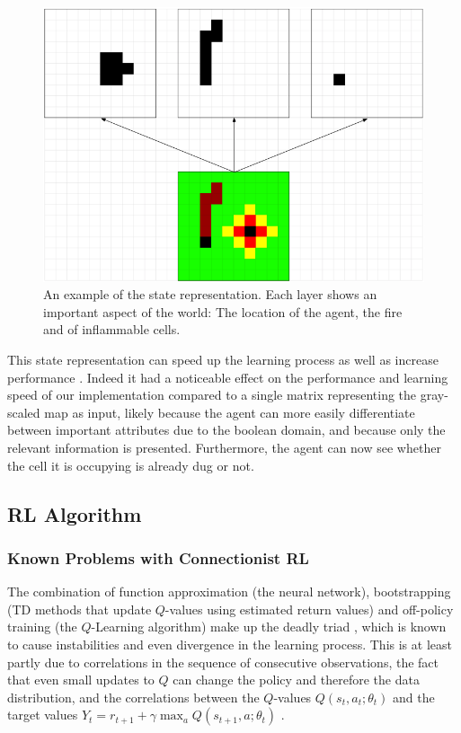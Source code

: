 \begin{figure}[h]
    \centering
    \includegraphics[width=1\linewidth]{img/Vision_Grid.png}
    \caption{An example of the state representation. Each layer shows an important aspect of the world: The location of the agent, the fire and of inflammable cells.}
    \label{fig:visiongrid}
\end{figure}

This state representation can speed up the learning process as well as increase performance \citep{knegt2018opponent}. Indeed it had a noticeable effect on the performance and learning speed of our implementation compared to a single matrix representing the gray-scaled map as input, likely because the agent can more easily differentiate between important attributes due to the boolean domain, and because only the relevant information is presented. Furthermore, the agent can now see whether the cell it is occupying is already dug or not.


\subsection{RL Algorithm}\label{sec:agent}

\subsubsection{Known Problems with Connectionist RL}\label{sec:problems}
The combination of function approximation (the neural network), bootstrapping (TD methods that update $Q$-values using estimated return values) and off-policy training (the $Q$-Learning algorithm) make up the deadly triad \citep{sutton_barto_2018}, which is known to cause instabilities and even divergence in the learning process. This is at least partly due to correlations in the sequence of consecutive observations, the fact that even small updates to $Q$ can change the policy and therefore the data distribution, and the correlations between the $Q$-values $Q(s_t, a_t; \theta_t)$ and the target values $Y_t = r_{t+1} + \gamma \max_a Q(s_{t+1}, a; \theta_t)$ \citep{mnih2015human}.

